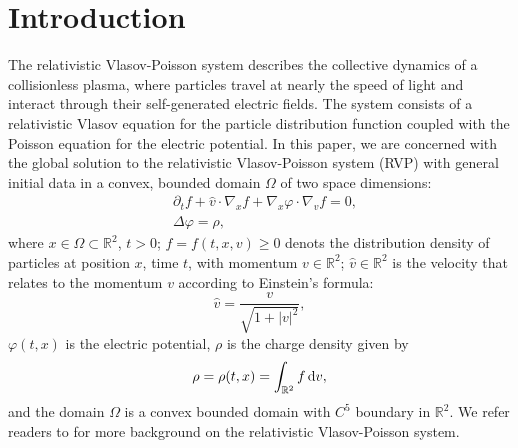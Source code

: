 \documentclass[11pt,reqno]{amsart}%
\theoremstyle{definition}
\theoremstyle{remark}
\begin{document}

\section{Introduction}

The relativistic Vlasov-Poisson system describes the collective dynamics of a collisionless plasma, where particles travel at nearly the speed of light and interact through their self-generated electric fields. The system consists of a relativistic Vlasov equation for the particle distribution function coupled with the Poisson equation for the electric potential.
In this paper, we are concerned with the global solution to the relativistic Vlasov-Poisson system (RVP) with general initial data in a convex, bounded domain $\Omega$ of two space dimensions:
 \begin{align}
&\partial_t f+\hat{v}\cdot\nabla_{x}f+\nabla_{x}\varphi\cdot\nabla_{v}f=0, %
\label{v1.5}\\
&\Delta\varphi=\rho, %
\label{v1.6}
\end{align}
where $x\in \Omega\subset \mathbb{R}^{2}$, $t>0$; $f=f(t,x,v)\geq 0$ denots  the  distribution density of particles at position $x$, time $t$, with momentum $v\in\mathbb{R}^{2}$;
$\hat{v}\in\mathbb{R}^{2}$ is the velocity that relates to the momentum $v$ according to Einstein's formula:
$$\hat{v}=\frac{v}{\sqrt{1+|v|^{2}}},$$
 $\varphi(t,x)$ is the electric potential, $\rho$  is the   charge  density   given by
 $$ \rho=\rho(t,x)= \int_{\mathbb{R}^{2}}f\, {\rm d}v,$$
 and the domain $\Omega$ is a  convex  bounded domain with $C^{5}$ boundary in $\mathbb{R}^{2}$. 
 We refer readers to \cite{KF,W} for more background on the relativistic Vlasov-Poisson system.
\end{document}
